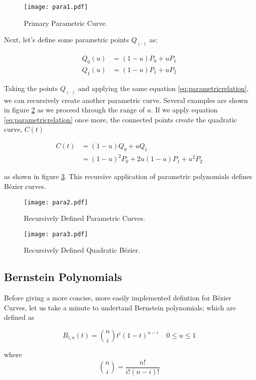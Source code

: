 \begin{figure}[htbp]
	\centering
	\texttt{[image: para1.pdf]}
	\caption{Primary Parametric Curve.}
	\label{fig:para1}
\end{figure}

Next, let's define some parametric points $Q_{(\cdot)}$ as:

\begin{align}
Q_0(u) &=  (1-u)P_0 + uP_1 \\
Q_1(u) &=  (1-u)P_1 + uP_2
 \end{align} 
 
Taking the points $Q_{(\cdot)}$ and applying the same equation \ref{eq:parametricrelation}, we can recursively create another parametric curve. Several examples are shown in figure \ref{fig:para2} as we proceed through the range of $u$. If we apply equation \ref{eq:parametricrelation} once more, the connected points create the quadratic curve, $C(t)$

\begin{align}
C(t) &= (1-u)Q_0 + uQ_1 \\
&= (1-u)^2P_0 + 2u(1-u)P_1+u^2P_2 
\end{align} 

as shown in figure \ref{fig:para3}. This recursive application of parametric polynomials defines Bézier curves.
 
 \begin{figure}[htbp]
 	\centering
 	\texttt{[image: para2.pdf]}
 	\caption{Recursively Defined Parametric Curves.}
 	\label{fig:para2}
 \end{figure}

 
\begin{figure}[htbp]
	\centering
	\texttt{[image: para3.pdf]}
	\caption{Recursively Defined Quadratic Bézier.}
	\label{fig:para3}
\end{figure}


\subsection{Bernstein Polynomials}
Before giving a more concise, more easily implemented defintion for Bézier Curves, let us take a minute to undertand Bernstein polynomials; which are defined as

\begin{equation} B_{i,n}(t) = {n\choose i} t^i (1-t)^{n-i} ~~~~~0\leq u \leq1 \end{equation}

where \begin{equation} {n\choose i} = \frac{n!}{i!(n-i)!} \end{equation} 

